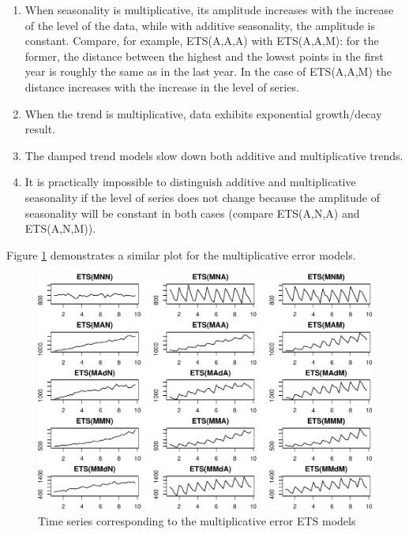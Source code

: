 \documentclass[
]{book}
\providecommand{\tightlist}{%
  \setlength{\itemsep}{0pt}\setlength{\parskip}{0pt}}
\theoremstyle{definition}
\theoremstyle{definition}
\theoremstyle{definition}
\theoremstyle{definition}
\theoremstyle{remark}
\begin{document}
\begin{enumerate}
\def\labelenumi{\arabic{enumi}.}
\tightlist
\item
  When seasonality is multiplicative, its amplitude increases with the increase of the level of the data, while with additive seasonality, the amplitude is constant. Compare, for example, ETS(A,A,A) with ETS(A,A,M): for the former, the distance between the highest and the lowest points in the first year is roughly the same as in the last year. In the case of ETS(A,A,M) the distance increases with the increase in the level of series.
\item
  When the trend is multiplicative, data exhibits exponential growth/decay result.
\item
  The damped trend models slow down both additive and multiplicative trends.
\item
  It is practically impossible to distinguish additive and multiplicative seasonality if the level of series does not change because the amplitude of seasonality will be constant in both cases (compare ETS(A,N,A) and ETS(A,N,M)).
\end{enumerate}

Figure \ref{fig:ETSTaxonomyMultiplicative} demonstrates a similar plot for the multiplicative error models.

\begin{figure}
\centering
\includegraphics{Svetunkov--2022----ADAM_files/figure-latex/ETSTaxonomyMultiplicative-1.pdf}
\caption{\label{fig:ETSTaxonomyMultiplicative}Time series corresponding to the multiplicative error ETS models}
\end{figure}
\end{document}
